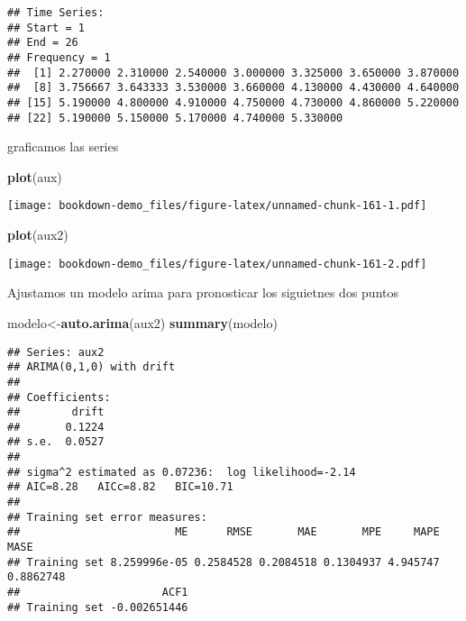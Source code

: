 \documentclass[]{book}
\newenvironment{Shaded}{\begin{snugshade}}{\end{snugshade}}
\newcommand{\KeywordTok}[1]{\textcolor[rgb]{0.13,0.29,0.53}{\textbf{#1}}}
\newcommand{\DataTypeTok}[1]{\textcolor[rgb]{0.13,0.29,0.53}{#1}}
\newcommand{\StringTok}[1]{\textcolor[rgb]{0.31,0.60,0.02}{#1}}
\newcommand{\OperatorTok}[1]{\textcolor[rgb]{0.81,0.36,0.00}{\textbf{#1}}}
\newcommand{\NormalTok}[1]{#1}
\theoremstyle{definition}
\theoremstyle{definition}
\theoremstyle{definition}
\theoremstyle{remark}
\begin{document}
\begin{verbatim}
## Time Series:
## Start = 1 
## End = 26 
## Frequency = 1 
##  [1] 2.270000 2.310000 2.540000 3.000000 3.325000 3.650000 3.870000
##  [8] 3.756667 3.643333 3.530000 3.660000 4.130000 4.430000 4.640000
## [15] 5.190000 4.800000 4.910000 4.750000 4.730000 4.860000 5.220000
## [22] 5.190000 5.150000 5.170000 4.740000 5.330000
\end{verbatim}

graficamos las series

\begin{Shaded}
\begin{Highlighting}[]
\KeywordTok{plot}\NormalTok{(aux)}
\end{Highlighting}
\end{Shaded}

\texttt{[image: bookdown-demo\_files/figure-latex/unnamed-chunk-161-1.pdf]}

\begin{Shaded}
\begin{Highlighting}[]
\KeywordTok{plot}\NormalTok{(aux2)}
\end{Highlighting}
\end{Shaded}

\texttt{[image: bookdown-demo\_files/figure-latex/unnamed-chunk-161-2.pdf]}

Ajustamos un modelo arima para pronosticar los siguietnes dos puntos

\begin{Shaded}
\begin{Highlighting}[]
\NormalTok{modelo<-}\KeywordTok{auto.arima}\NormalTok{(aux2)}
\KeywordTok{summary}\NormalTok{(modelo)}
\end{Highlighting}
\end{Shaded}

\begin{verbatim}
## Series: aux2 
## ARIMA(0,1,0) with drift 
## 
## Coefficients:
##        drift
##       0.1224
## s.e.  0.0527
## 
## sigma^2 estimated as 0.07236:  log likelihood=-2.14
## AIC=8.28   AICc=8.82   BIC=10.71
## 
## Training set error measures:
##                        ME      RMSE       MAE       MPE     MAPE      MASE
## Training set 8.259996e-05 0.2584528 0.2084518 0.1304937 4.945747 0.8862748
##                      ACF1
## Training set -0.002651446
\end{verbatim}

\begin{Shaded}
\end{Shaded}
\end{document}
